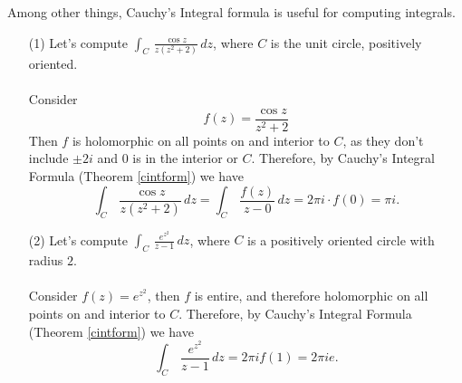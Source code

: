 Among other things, Cauchy's Integral formula is useful for computing integrals. 
\begin{example}\hfill
\begin{itemize}[itemsep=2em]
\item[(1)] Let's compute $\displaystyle \int_C\, \frac{\cos z}{z(z^2 + 2)}\, dz$, where $C$ is the unit circle, positively oriented.\\
\\
Consider
\[f(z) = \frac{\cos z}{z^2 + 2}\]
Then $f$ is holomorphic on all points on and interior to $C$, as they don't include $\pm 2i$ and $0$ is in the interior or $C$. Therefore, by Cauchy's Integral Formula (Theorem \ref{cintform}) we have
\[\int_C\, \frac{\cos z}{z(z^2 + 2)}\, dz = \int_C\, \frac{f(z)}{z - 0}\, dz = 2\pi i\cdot f(0) = \pi i.\]

\item[(2)] Let's compute $\displaystyle \int_C\, \frac{e^{z^2}}{z - 1}\, dz$, where $C$ is a positively oriented circle with radius $2$.\\
\\
Consider $f(z) = e^{z^2}$, then $f$ is entire, and therefore holomorphic on all points on and interior to $C$. Therefore, by Cauchy's Integral Formula (Theorem \ref{cintform}) we have
\[\int_C\, \frac{e^{z^2}}{z - 1}\, dz = 2\pi if(1) = 2\pi ie.\]


\end{itemize}
\end{example}
